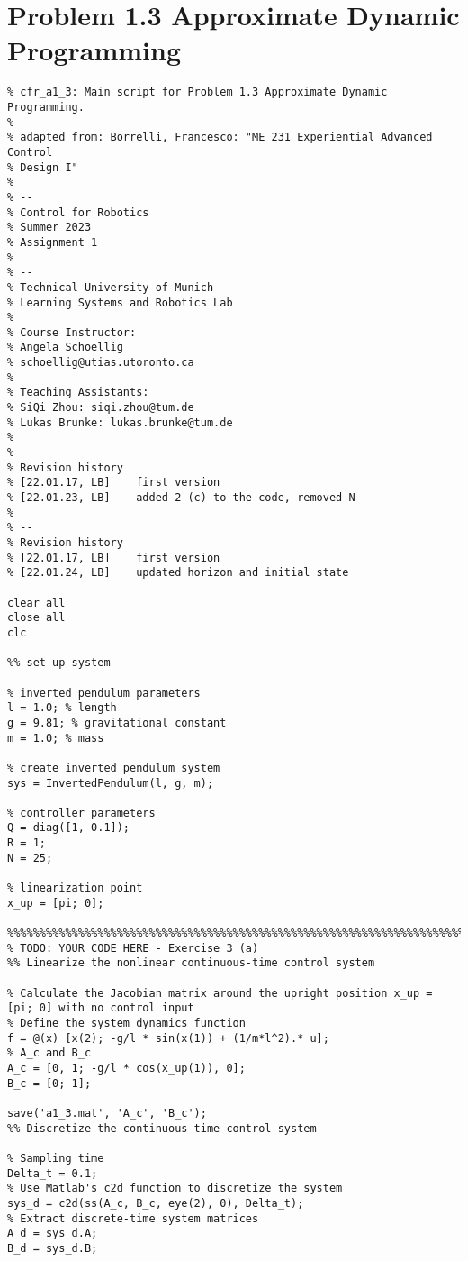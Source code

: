 \documentclass[8pt, a4paper, oneside, justified]{article}
\numberwithin{equation}{section}
\begin{document}
\newpage

\section*{Problem 1.3 Approximate Dynamic Programming}
\setcounter{equation}{0} %

\begin{lstlisting}
% cfr_a1_3: Main script for Problem 1.3 Approximate Dynamic Programming.
%
% adapted from: Borrelli, Francesco: "ME 231 Experiential Advanced Control
% Design I"
%
% --
% Control for Robotics
% Summer 2023
% Assignment 1
%
% --
% Technical University of Munich
% Learning Systems and Robotics Lab
%
% Course Instructor:
% Angela Schoellig
% schoellig@utias.utoronto.ca
%
% Teaching Assistants: 
% SiQi Zhou: siqi.zhou@tum.de
% Lukas Brunke: lukas.brunke@tum.de
%
% --
% Revision history
% [22.01.17, LB]    first version
% [22.01.23, LB]    added 2 (c) to the code, removed N
%
% --
% Revision history
% [22.01.17, LB]    first version
% [22.01.24, LB]    updated horizon and initial state

clear all
close all
clc

%% set up system

% inverted pendulum parameters
l = 1.0; % length
g = 9.81; % gravitational constant
m = 1.0; % mass

% create inverted pendulum system
sys = InvertedPendulum(l, g, m);

% controller parameters
Q = diag([1, 0.1]);
R = 1;
N = 25;

% linearization point
x_up = [pi; 0];

%%%%%%%%%%%%%%%%%%%%%%%%%%%%%%%%%%%%%%%%%%%%%%%%%%%%%%%%%%%%%%%%%%%%%%%%%%%
% TODO: YOUR CODE HERE - Exercise 3 (a)
%% Linearize the nonlinear continuous-time control system

% Calculate the Jacobian matrix around the upright position x_up = [pi; 0] with no control input
% Define the system dynamics function
f = @(x) [x(2); -g/l * sin(x(1)) + (1/m*l^2).* u];
% A_c and B_c
A_c = [0, 1; -g/l * cos(x_up(1)), 0];
B_c = [0; 1];

save('a1_3.mat', 'A_c', 'B_c');
%% Discretize the continuous-time control system

% Sampling time
Delta_t = 0.1;
% Use Matlab's c2d function to discretize the system
sys_d = c2d(ss(A_c, B_c, eye(2), 0), Delta_t);
% Extract discrete-time system matrices
A_d = sys_d.A;
B_d = sys_d.B;


\end{lstlisting}
\end{document}
